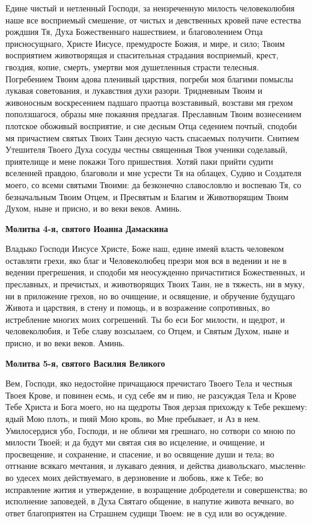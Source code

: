 Едине чистый и нетленный Господи, за неизреченную милость человеколюбия наше все восприемый смешение, от чистых и девственных кровей паче естества рождшия Тя, Духа Божественнаго нашествием, и благоволением Отца присносущнаго, Христе Иисусе, премудросте Божия, и мире, и сило; Твоим восприятием животворящая и спасительная страдания восприемый, крест, гвоздия, копие, смерть, умертви моя душетленныя страсти телесныя. Погребением Твоим адова пленивый царствия, погреби моя благими помыслы лукавая советования, и лукавствия духи разори. Тридневным Твоим и живоносным воскресением падшаго праотца возставивый, возстави мя грехом поползшагося, образы мне покаяния предлагая. Преславным Твоим вознесением плотское обоживый восприятие, и сие десным Отца седением почтый, сподоби мя причастием святых Твоих Таин десную часть спасаемых получити. Снитием Утешителя Твоего Духа сосуды честны священныя Твоя ученики соделавый, приятелище и мене покажи Того пришествия. Хотяй паки прийти судити вселенней правдою, благоволи и мне усрести Тя на облацех, Судию и Создателя моего, со всеми святыми Твоими: да безконечно славословлю и воспеваю Тя, со безначальным Твоим Отцем, и Пресвятым и Благим и Животворящим Твоим Духом, ныне и присно, и во веки веков. Аминь.




\bfseries Молитва 4-я, святого Иоанна Дамаскина\normalfont{}


Владыко Господи Иисусе Христе, Боже наш, едине имеяй власть человеком оставляти грехи, яко благ и Человеколюбец презри моя вся в ведении и не в ведении прегрешения, и сподоби мя неосужденно причаститися Божественных, и преславных, и пречистых, и животворящих Твоих Таин, не в тяжесть, ни в муку, ни в приложение грехов, но во очищение, и освящение, и обручение будущаго Живота и царствия, в стену и помощь, и в возражение сопротивных, во истребление многих моих согрешений. Ты бо еси Бог милости, и щедрот, и человеколюбия, и Тебе славу возсылаем, со Отцем, и Святым Духом, ныне и присно, и во веки веков. Аминь.




\bfseries Молитва 5-я, святого Василия Великого\normalfont{}


Вем, Господи, яко недостойне причащаюся пречистаго Твоего Тела и честныя Твоея Крове, и повинен есмь, и суд себе ям и пию, не разсуждая Тела и Крове Тебе Христа и Бога моего, но на щедроты Твоя дерзая прихожду к Тебе рекшему: ядый Мою плоть, и пияй Мою кровь, во Мне пребывает, и Аз в нем. Умилосердися убо, Господи, и не обличи мя грешнаго, но сотвори со мною по милости Твоей; и да будут ми святая сия во исцеление, и очищение, и просвещение, и сохранение, и спасение, и во освящение души и тела; во отгнание всякаго мечтания, и лукаваго деяния, и действа диавольскаго, мысленнe во удесех моих действуемаго, в дерзновение и любовь, яже к Тебе; во исправление жития и утверждение, в возращение добродетели и совершенства; во исполнение заповедей, в Духа Святаго общение, в напутие живота вечнаго, во ответ благоприятен на Страшнем судищи Твоем: не в суд или во осуждение.





